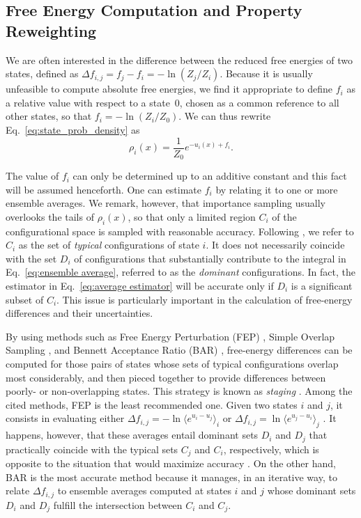 \documentclass[journal=jctcce,manuscript=article,layout=twocolumn]{achemso}
\begin{document}
\subsection{Free Energy Computation and Property Reweighting}
\label{sec:fep and reweighting}

We are often interested in the difference between the reduced free energies of two states, defined as $\Delta f_{i,j} = f_j - f_i = - \ln (Z_j/Z_i)$. Because it is usually unfeasible to compute absolute free energies, we find it appropriate to define $f_i$ as a relative value with respect to a state~$0$, chosen as a common reference to all other states, so that $f_i = -\ln (Z_i/Z_0)$. We can thus rewrite Eq.~\eqref{eq:state_prob_density} as
\begin{equation}
\label{eq:state_prob_density_Z0}
\rho_i(x) = \frac{1}{Z_0} e^{-u_i(x)+ f_i}.
\end{equation}

The value of $f_i$ can only be determined up to an additive constant and this fact will be assumed henceforth. One can estimate $f_i$ by relating it to one or more ensemble averages. We remark, however, that importance sampling usually overlooks the tails of $\rho_i(x)$, so that only a limited region $C_i$ of the configurational space is sampled with reasonable accuracy. Following \citeauthor{Jarzynski_2006} \cite{Jarzynski_2006}, we refer to $C_i$ as the set of \textit{typical} configurations of state $i$. It does not necessarily coincide with the set $D_i$ of configurations that substantially contribute to the integral in Eq.~\eqref{eq:ensemble average}, referred to as the \textit{dominant} configurations. In fact, the estimator in Eq.~\eqref{eq:average estimator} will be accurate only if $D_i$ is a significant subset of $C_i$. This issue is particularly important in the calculation of free-energy differences and their uncertainties.

By using methods such as Free Energy Perturbation (FEP) \cite{Zwanzig_1954}, Simple Overlap Sampling \cite{Lee_1980, Lu_2003}, and Bennett Acceptance Ratio (BAR) \cite{Bennett_1976}, free-energy differences can be computed for those pairs of states whose sets of typical configurations overlap most considerably, and then pieced together to provide differences between poorly- or non-overlapping states. This strategy is known as \textit{staging} \cite{Kofke_1998}. Among the cited methods, FEP is the least recommended one. Given two states $i$ and $j$, it consists in evaluating either $\Delta f_{i,j} = -\ln \langle e^{u_i - u_j} \rangle_i$ or $\Delta f_{i,j} = \ln \langle e^{u_j - u_i} \rangle_j$ \cite{Zwanzig_1954}. It happens, however, that these averages entail dominant sets $D_i$ and $D_j$ that practically coincide with the typical sets $C_j$ and $C_i$, respectively, which is opposite to the situation that would maximize accuracy \cite{Jarzynski_2006}. On the other hand, BAR is the most accurate method because it manages, in an iterative way, to relate $\Delta f_{i,j}$ to ensemble averages computed at states $i$ and $j$ whose dominant sets $D_i$ and $D_j$ fulfill the intersection between $C_i$ and $C_j$.
\end{document}

